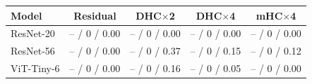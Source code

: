 \begin{tabular}{lcccc}
\toprule
Model & Residual & DHC$\times$2 & DHC$\times$4 & mHC$\times$4 \\
\midrule
ResNet-20 & -- / 0 / 0.00 & -- / 0 / 0.00 & -- / 0 / 0.00 & -- / 0 / 0.00 \\
ResNet-56 & -- / 0 / 0.00 & -- / 0 / 0.37 & -- / 0 / 0.15 & -- / 0 / 0.12 \\
ViT-Tiny-6 & -- / 0 / 0.00 & -- / 0 / 0.16 & -- / 0 / 0.05 & -- / 0 / 0.00 \\
\bottomrule
\end{tabular}
